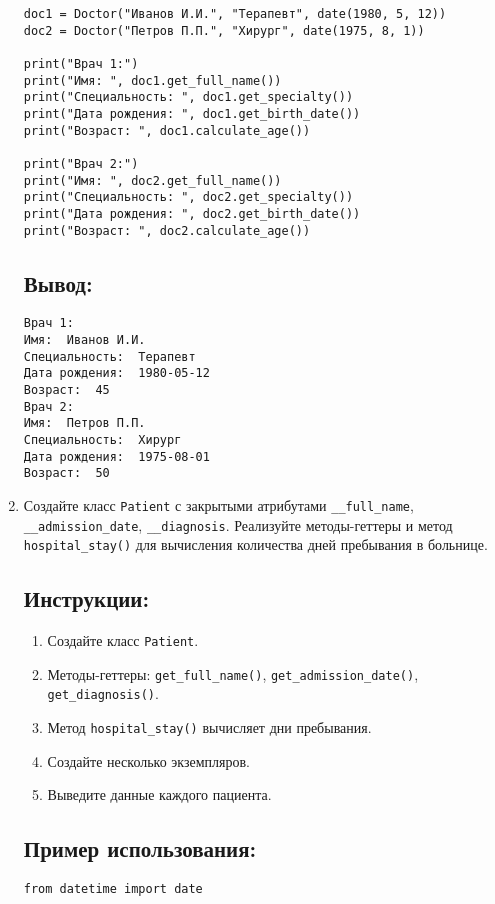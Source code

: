 \begin{enumerate}
\begin{lstlisting}[caption=Пример кода]
doc1 = Doctor("Иванов И.И.", "Терапевт", date(1980, 5, 12))
doc2 = Doctor("Петров П.П.", "Хирург", date(1975, 8, 1))

print("Врач 1:")
print("Имя: ", doc1.get_full_name())
print("Специальность: ", doc1.get_specialty())
print("Дата рождения: ", doc1.get_birth_date())
print("Возраст: ", doc1.calculate_age())

print("Врач 2:")
print("Имя: ", doc2.get_full_name())
print("Специальность: ", doc2.get_specialty())
print("Дата рождения: ", doc2.get_birth_date())
print("Возраст: ", doc2.calculate_age())
\end{lstlisting}

\subsection*{Вывод:}
\begin{lstlisting}[caption=Ожидаемый вывод]
Врач 1:
Имя:  Иванов И.И.
Специальность:  Терапевт
Дата рождения:  1980-05-12
Возраст:  45
Врач 2:
Имя:  Петров П.П.
Специальность:  Хирург
Дата рождения:  1975-08-01
Возраст:  50
\end{lstlisting}

\item
Создайте класс \texttt{Patient} с закрытыми атрибутами \texttt{\_\_full\_name}, \texttt{\_\_admission\_date}, \texttt{\_\_diagnosis}. Реализуйте методы-геттеры и метод \texttt{hospital\_stay()} для вычисления количества дней пребывания в больнице.

\subsection*{Инструкции:}
\begin{enumerate}
    \item Создайте класс \texttt{Patient}.
    \item Методы-геттеры: \texttt{get\_full\_name()}, \texttt{get\_admission\_date()}, \texttt{get\_diagnosis()}.
    \item Метод \texttt{hospital\_stay()} вычисляет дни пребывания.
    \item Создайте несколько экземпляров.
    \item Выведите данные каждого пациента.
\end{enumerate}

\subsection*{Пример использования:}
\begin{lstlisting}[caption=Пример кода]
from datetime import date


\end{lstlisting}
\end{enumerate}
